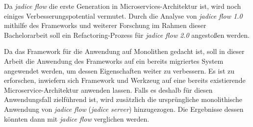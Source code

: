 Da \emph{jadice flow} die erste Generation in Microservices-Architektur ist, wird noch einiges Verbesserungspotential vermutet. 
Durch die Analyse von \emph{jadice flow 1.0} mithilfe des Frameworks und weiterer Forschung im Rahmen dieser Bachelorarbeit soll ein Refactoring-Prozess für \emph{jadice flow 2.0} angestoßen werden.

Da das Framework für die Anwendung auf Monolithen gedacht ist, soll in dieser Arbeit die Anwendung des Frameworks auf ein bereits migriertes System angewendet werden, um dessen Eigenschaften weiter zu verbessern. 
Es ist zu erforschen, inwiefern sich Framework und Werkzeug auf eine bereits existierende Microservice-Architektur anwenden lassen. 
Falls es deshalb für diesen Anwendungsfall zielführend ist, wird zusätzlich die ursprüngliche monolithische Anwendung von \emph{jadice flow} (\emph{jadice server}) hinzugezogen. 
Die Ergebnisse dessen könnten dann mit \emph{jadice flow} verglichen werden.